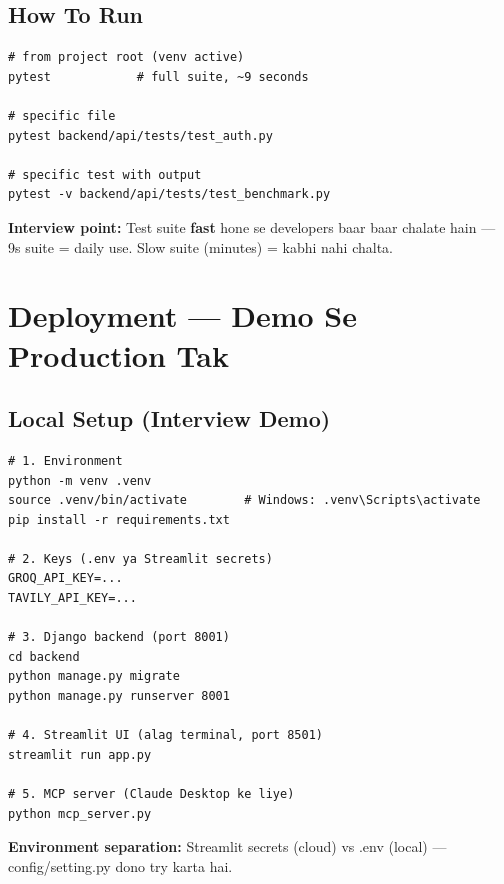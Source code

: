 \subsection{How To Run}

\begin{codestorybox}
\begin{lstlisting}[style=bashstyle]
# from project root (venv active)
pytest            # full suite, ~9 seconds

# specific file
pytest backend/api/tests/test_auth.py

# specific test with output
pytest -v backend/api/tests/test_benchmark.py
\end{lstlisting}

\textbf{Interview point:} Test suite \textbf{fast} hone se developers baar baar chalate hain --- 9s suite = daily use. Slow suite (minutes) = kabhi nahi chalta.
\end{codestorybox}

\section{Deployment --- Demo Se Production Tak}

\subsection{Local Setup (Interview Demo)}

\begin{codestorybox}
\begin{lstlisting}[style=bashstyle]
# 1. Environment
python -m venv .venv
source .venv/bin/activate        # Windows: .venv\Scripts\activate
pip install -r requirements.txt

# 2. Keys (.env ya Streamlit secrets)
GROQ_API_KEY=...
TAVILY_API_KEY=...

# 3. Django backend (port 8001)
cd backend
python manage.py migrate
python manage.py runserver 8001

# 4. Streamlit UI (alag terminal, port 8501)
streamlit run app.py

# 5. MCP server (Claude Desktop ke liye)
python mcp_server.py
\end{lstlisting}

\textbf{Environment separation:} Streamlit secrets (cloud) vs .env (local) --- config/setting.py dono try karta hai.
\end{codestorybox}

